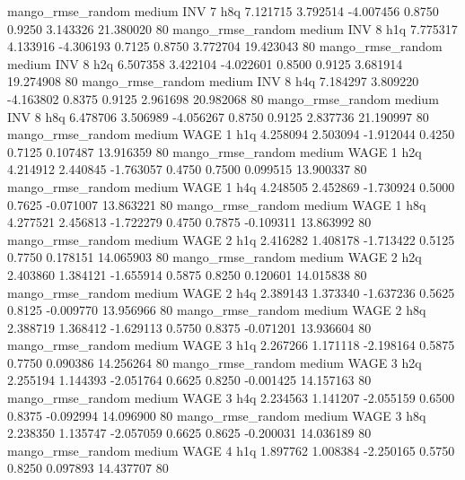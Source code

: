 mango_rmse_random     medium      INV                 7                  h8q  7.121715 3.792514 -4.007456 0.8750 0.9250  3.143326   21.380020 80
mango_rmse_random     medium      INV                 8                  h1q  7.775317 4.133916 -4.306193 0.7125 0.8750  3.772704   19.423043 80
mango_rmse_random     medium      INV                 8                  h2q  6.507358 3.422104 -4.022601 0.8500 0.9125  3.681914   19.274908 80
mango_rmse_random     medium      INV                 8                  h4q  7.184297 3.809220 -4.163802 0.8375 0.9125  2.961698   20.982068 80
mango_rmse_random     medium      INV                 8                  h8q  6.478706 3.506989 -4.056267 0.8750 0.9125  2.837736   21.190997 80
mango_rmse_random     medium     WAGE                 1                  h1q  4.258094 2.503094 -1.912044 0.4250 0.7125  0.107487   13.916359 80
mango_rmse_random     medium     WAGE                 1                  h2q  4.214912 2.440845 -1.763057 0.4750 0.7500  0.099515   13.900337 80
mango_rmse_random     medium     WAGE                 1                  h4q  4.248505 2.452869 -1.730924 0.5000 0.7625 -0.071007   13.863221 80
mango_rmse_random     medium     WAGE                 1                  h8q  4.277521 2.456813 -1.722279 0.4750 0.7875 -0.109311   13.863992 80
mango_rmse_random     medium     WAGE                 2                  h1q  2.416282 1.408178 -1.713422 0.5125 0.7750  0.178151   14.065903 80
mango_rmse_random     medium     WAGE                 2                  h2q  2.403860 1.384121 -1.655914 0.5875 0.8250  0.120601   14.015838 80
mango_rmse_random     medium     WAGE                 2                  h4q  2.389143 1.373340 -1.637236 0.5625 0.8125 -0.009770   13.956966 80
mango_rmse_random     medium     WAGE                 2                  h8q  2.388719 1.368412 -1.629113 0.5750 0.8375 -0.071201   13.936604 80
mango_rmse_random     medium     WAGE                 3                  h1q  2.267266 1.171118 -2.198164 0.5875 0.7750  0.090386   14.256264 80
mango_rmse_random     medium     WAGE                 3                  h2q  2.255194 1.144393 -2.051764 0.6625 0.8250 -0.001425   14.157163 80
mango_rmse_random     medium     WAGE                 3                  h4q  2.234563 1.141207 -2.055159 0.6500 0.8375 -0.092994   14.096900 80
mango_rmse_random     medium     WAGE                 3                  h8q  2.238350 1.135747 -2.057059 0.6625 0.8625 -0.200031   14.036189 80
mango_rmse_random     medium     WAGE                 4                  h1q  1.897762 1.008384 -2.250165 0.5750 0.8250  0.097893   14.437707 80
